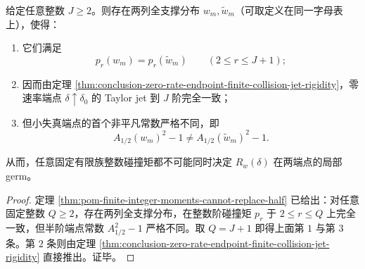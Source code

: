 \begin{corollary}[两端点的不可兼容有限决定性]\label{cor:conclusion-two-endpoint-incompatible-finite-determinacy}
给定任意整数 \(J\ge 2\)。则存在两列全支撑分布 \(w_m,\widetilde w_m\)（可取定义在同一字母表上），使得：
\begin{enumerate}
  \item 它们满足
  \[
  p_r(w_m)=p_r(\widetilde w_m)\qquad (2\le r\le J+1);
  \]
  \item 因而由定理 \ref{thm:conclusion-zero-rate-endpoint-finite-collision-jet-rigidity}，零速率端点 \(\delta\uparrow\delta_0\) 的 Taylor jet 到 \(J\) 阶完全一致；
  \item 但小失真端点的首个非平凡常数严格不同，即
  \[
  A_{1/2}(w_m)^2-1\ne A_{1/2}(\widetilde w_m)^2-1.
  \]
\end{enumerate}
从而，任意固定有限族整数碰撞矩都不可能同时决定 \(R_w(\delta)\) 在两端点的局部 germ。
\end{corollary}
\begin{proof}
定理 \ref{thm:pom-finite-integer-moments-cannot-replace-half} 已给出：对任意固定整数 \(Q\ge 2\)，存在两列全支撑分布，在整数阶碰撞矩 \(p_r\) 于 \(2\le r\le Q\) 上完全一致，但半阶端点常数 \(A_{1/2}^2-1\) 严格不同。取 \(Q=J+1\) 即得上面第 \(1\) 与第 \(3\) 条。第 \(2\) 条则由定理 \ref{thm:conclusion-zero-rate-endpoint-finite-collision-jet-rigidity} 直接推出。证毕。
\end{proof}

